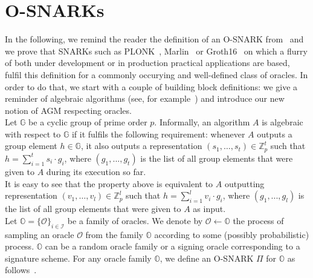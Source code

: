 \section{O-SNARKs}
\label{sec:short_snarks_defs}
In the following, we remind the reader the definition of an O-SNARK from~\cite{O_SNARK} and we prove that 
SNARKs such as PLONK~\cite{plonk}, Marlin~\cite{marlin} or Groth16~\cite{groth16} on which a flurry of 
both under development or in production practical applications are based, fulfil this definition for a commonly occurying 
and well-defined class of oracles. In order to do that, we start with a couple of building block definitions: we give a 
reminder of algebraic algorithms (see, for example~\cite{AGM_model}) and introduce our new notion of AGM respecting oracles. \\

\noindent Let $\mathbb{G}$ be a cyclic group of prime order $p$. Informally, an algorithm $A$ is algebraic with respect to 
$\mathbb{G}$ if it fulfils the following requirement: whenever $A$ outputs a group element $h \in \mathbb{G}$, 
it also outputs a representation $(s_1, \ldots, s_t) \in \mathbb{Z}^{t}_p$ 
such that $h = \sum_ {i =1}^t s_i \cdot g_i$, where $(g_1,...,g_t)$ is the list of all group elements that were given to $A$ during its execution so far. \\

\noindent It is easy to see that the property above is equivalent to $A$ outputting  representation $(v_1, \ldots, v_l) \in \mathbb{Z}^{l}_p$ 
such that $h = \sum_ {i =1}^l v_i \cdot g_i$, where $(g_1,...,g_l)$ is the list of all group elements that were given to $A$ as input. \\


\noindent Let $\mathbb{O} = \{ \mathcal{O} \}_{i \in \mathcal{I}}$ be a family of oracles. We denote by $\mathcal{O} \leftarrow \mathbb{O}$ 
the process of sampling an oracle $\mathcal{O}$ from the family $\mathbb{O}$ according to some (possibly probabilistic) process.
$\mathbb{O}$ can be a random oracle family or a signing oracle corresponding to a signature scheme. For any oracle family 
$\mathbb{O}$, we define an O-SNARK $\Pi$ for $\mathbb{O}$ as follows~\cite{O_SNARK}. \\

